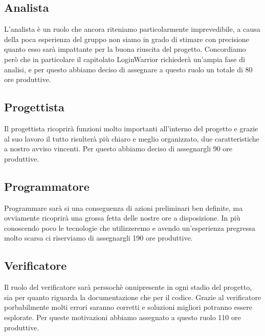 \subsection{Analista}
L'analista è un ruolo che ancora riteniamo particolarmente imprevedibile, a causa della poca esperienza del gruppo non siamo in grado di stimare con precisione quanto esso sarà impattante per la buona
riuscita del progetto. Concordiamo però che in particolare il capitolato LoginWarrior richiederà un'ampia fase di analisi, e per questo abbiamo deciso di assegnare a questo ruolo un totale di 80 ore produttive.

\subsection{Progettista}
Il progettista ricoprirà funzioni molto importanti all'interno del progetto e grazie al suo lavoro il tutto risulterà più chiaro e meglio organizzato, due caratteristiche a nostro avviso vincenti.
Per questo abbiamo deciso di assegnargli 90 ore produttive.

\subsection{Programmatore}
Programmare sarà si una conseguenza di azioni preliminari ben definite, ma ovviamente ricoprirà una grossa fetta delle nostre ore a disposizione. In più conoscendo poco le tecnologie che utilizzeremo e avendo
un'esperienza pregressa molto scarsa ci riserviamo di assegnargli 190 ore produttive.

\subsection{Verificatore}
Il ruolo del verificatore sarà perssochè onnipresente in ogni stadio del progetto, sia per quanto riguarda la documentazione che per il codice. Grazie al verificatore porbabilmente molti errori saranno corretti
e soluzioni migliori potranno essere esplorate. Per queste motivazioni abbiamo assegnato a questo ruolo 110 ore produttive.


